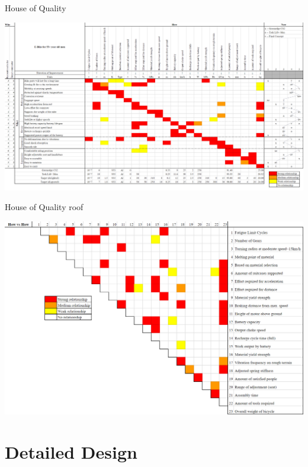 \documentclass[a4paper,11pt]{article}
\begin{document}
\thispagestyle{empty}
\begin{landscape}

\vspace*{\fill} 
\begin{table}[!ht]
	\centering
	\caption{House of Quality}
	\includegraphics[width=1.44\textwidth]{Hous}
	\label{tab:hoq}
\end{table}
\vspace*{\fill} 

\newpage
\thispagestyle{empty}

\begin{table}[!ht]
	\centering
	\caption{House of Quality roof}
	\includegraphics[width=1.44\textwidth]{Roof}
	\label{tab:roof}
\end{table}

\end{landscape}
\restoregeometry

\section{Detailed Design}
\end{document}
